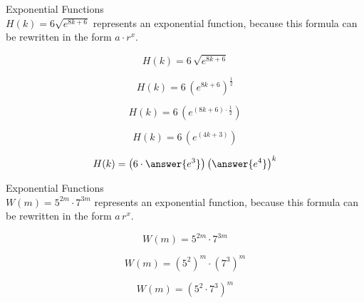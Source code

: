 \documentclass{ximera}
\begin{document}
\begin{example}  Exponential Functions \\



$H(k) = 6 \sqrt{e^{8 k + 6}} $ represents an exponential function, because this formula can be rewritten in the form $a \cdot r^x$.   \\


\begin{explanation}


\[
H(k) = 6 \, \sqrt{e^{8 k + 6}}
\]


\[
H(k) = 6 \, \left( e^{8 k + 6} \right)^{\tfrac{1}{2}}
\]

\[
H(k) = 6 \, \left( e^{(8 k + 6 ) \cdot \tfrac{1}{2}} \right)
\]

\[
H(k) = 6 \, \left( e^{(4 k + 3)} \right)
\]

\[
H(k) = \left( 6 \cdot \answer{e^3} \right) \left( \answer{e^4} \right)^k
\]


\end{explanation}

\end{example}

















\begin{example}  Exponential Functions \\



$W(m) = 5^{2 m} \cdot 7^{3 m}$ represents an exponential function, because this formula can be rewritten in the form $a \, r^x$.   \\


\begin{explanation}


\[
W(m) = 5^{2 m} \cdot 7^{3 m}
\]


\[
W(m) = \left( 5^2 \right)^m \cdot \left( 7^3 \right)^m
\]

\[
W(m) = \left( 5^2 \cdot 7^3 \right)^m 
\]




\end{explanation}

\end{example}
\end{document}
